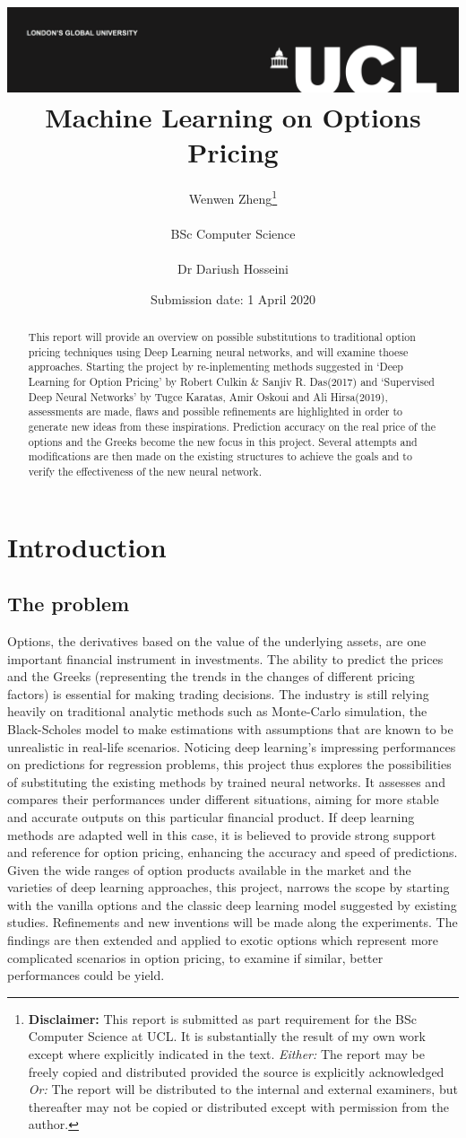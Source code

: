 \documentclass{report}
\title{{\vspace{-14em} \includegraphics[scale=0.4]{ucl_logo.png}}\\
{{\Huge Machine Learning on Options Pricing}}\\
}
\date{Submission date: 1 April 2020}
\author{Wenwen Zheng\thanks{
{\bf Disclaimer:}
This report is submitted as part requirement for the BSc Computer Science at UCL. It is
substantially the result of my own work except where explicitly indicated in the text.
\emph{Either:} The report may be freely copied and distributed provided the source is explicitly acknowledged
\newline  
\emph{Or:}\newline
The report will be distributed to the internal and external examiners, but thereafter may not be copied or distributed except with permission from the author.}
\\ \\
BSc Computer Science\\ \\
Dr Dariush Hosseini }
\begin{document}
 
\onehalfspacing
\maketitle
\begin{abstract}

This report will provide an overview on possible substitutions to traditional option pricing techniques using Deep Learning neural networks, and will examine thoese approaches. Starting the project by re-inplementing methods suggested in ‘Deep Learning for Option Pricing’ by Robert Culkin & Sanjiv R. Das(2017) and ‘Supervised Deep Neural Networks’ by Tugce Karatas, Amir Oskoui and Ali Hirsa(2019),  assessments are made, flaws and possible refinements are highlighted in order to generate new ideas from these inspirations. Prediction accuracy on the real price of the options and the Greeks become the new focus in this project. Several attempts and modifications are then made on the existing structures to achieve the goals and to verify the effectiveness of the new neural network. 

\end{abstract}
\tableofcontents
\setcounter{page}{1}


\chapter{Introduction}

\section{The problem}
Options, the derivatives based on the value of the underlying assets, are one important financial instrument in investments. The ability to predict the prices and the Greeks (representing the trends in the changes of different pricing factors) is essential for making trading decisions. The industry is still relying heavily on traditional analytic methods such as Monte-Carlo simulation, the Black-Scholes model to make estimations with assumptions that are known to be unrealistic in real-life scenarios. Noticing deep learning's impressing performances on predictions for regression problems, this project thus explores the possibilities of substituting the existing methods by trained neural networks. It assesses and compares their performances under different situations, aiming for more stable and accurate outputs on this particular financial product.
If deep learning methods are adapted well in this case, it is believed to provide strong support and reference for option pricing, enhancing the accuracy and speed of predictions.
Given the wide ranges of option products available in the market and the varieties of deep learning approaches, this project, narrows the scope by starting with the vanilla options and the classic deep learning model suggested by existing studies. Refinements and new inventions will be made along the experiments. The findings are then extended and applied to exotic options which represent more complicated scenarios in option pricing,  to examine if similar, better performances could be yield. 
\end{document}
